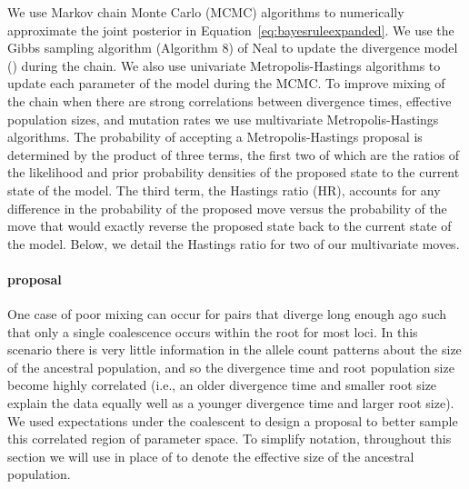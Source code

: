 We use Markov chain Monte Carlo (MCMC) algorithms to numerically approximate
the joint posterior in Equation~\ref{eq:bayesruleexpanded}.
We use the Gibbs sampling algorithm (Algorithm 8) of Neal \citeyear{Neal2000}
to update the divergence model (\divtimemodel) during the chain.
We also use univariate Metropolis-Hastings algorithms
\citep{Metropolis1953,Hastings1970} to update each parameter of the model
during the MCMC.
To improve mixing of the chain when there are strong correlations between
divergence times, effective population sizes, and mutation rates we use
multivariate Metropolis-Hastings algorithms.
The probability of accepting a Metropolis-Hastings proposal is determined
by the product of three terms, the first two of which are the
ratios of the likelihood and prior probability densities of the proposed
state to the current state of the model.
The third term, the Hastings ratio (HR), accounts for any difference in the
probability of the proposed move versus the probability of the move that
would exactly reverse the proposed state back to the current state of the
model.
Below, we detail the Hastings ratio for two of our multivariate moves.

\paragraph{\timerootsizemixer proposal}
One case of poor mixing can occur for pairs that diverge long enough ago such
that only a single coalescence occurs within the root for most loci.
In this scenario there is very little information in the allele count patterns
about the size of the ancestral population, and so the divergence time and root
population size become highly correlated (i.e., an older divergence time and
smaller root size explain the data equally well as a younger divergence time
and larger root size).
We used expectations under the coalescent to design a proposal to better sample
this correlated region of parameter space.
To simplify notation, throughout this section we will use
\sepopsize[\rootpopindex] in place of \epopsize[\rootpopindex] to denote the
effective size of the ancestral population.

